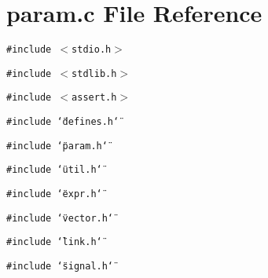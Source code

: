 \section{param.c File Reference}
\label{param_8c}
{\tt \#include $<$stdio.h$>$}\par
{\tt \#include $<$stdlib.h$>$}\par
{\tt \#include $<$assert.h$>$}\par
{\tt \#include \char`\"{}defines.h\char`\"{}}\par
{\tt \#include \char`\"{}param.h\char`\"{}}\par
{\tt \#include \char`\"{}util.h\char`\"{}}\par
{\tt \#include \char`\"{}expr.h\char`\"{}}\par
{\tt \#include \char`\"{}vector.h\char`\"{}}\par
{\tt \#include \char`\"{}link.h\char`\"{}}\par
{\tt \#include \char`\"{}signal.h\char`\"{}}\par
